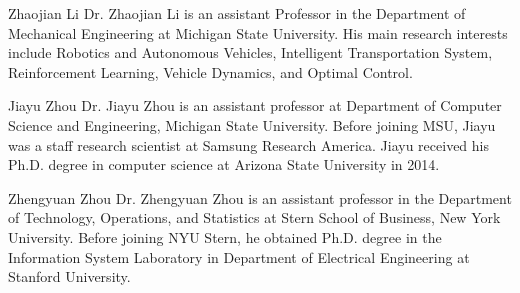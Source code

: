 \documentclass[journal]{IEEEtran}
\begin{document}
\begin{IEEEbiography}{Zhaojian Li}
Dr. Zhaojian Li is an assistant Professor in the Department of Mechanical Engineering at Michigan State University. His main research interests include Robotics and Autonomous Vehicles, Intelligent Transportation System, Reinforcement Learning, Vehicle Dynamics, and Optimal Control.
\end{IEEEbiography}

\begin{IEEEbiography}{Jiayu Zhou}
Dr. Jiayu Zhou is an assistant professor at
 Department of Computer Science and Engineering, Michigan State University.
 Before joining MSU, Jiayu was a staff research scientist at Samsung Research
 America. Jiayu received his Ph.D. degree in computer science at Arizona
 State University in 2014. 
\end{IEEEbiography}

\begin{IEEEbiography}{Zhengyuan Zhou}
Dr. Zhengyuan Zhou is an assistant professor in the Department of Technology, Operations, and Statistics at Stern School of Business, New York University. Before joining NYU Stern, he obtained Ph.D. degree in the Information System Laboratory in Department of Electrical Engineering at Stanford University. 
\end{IEEEbiography}
\end{document}
